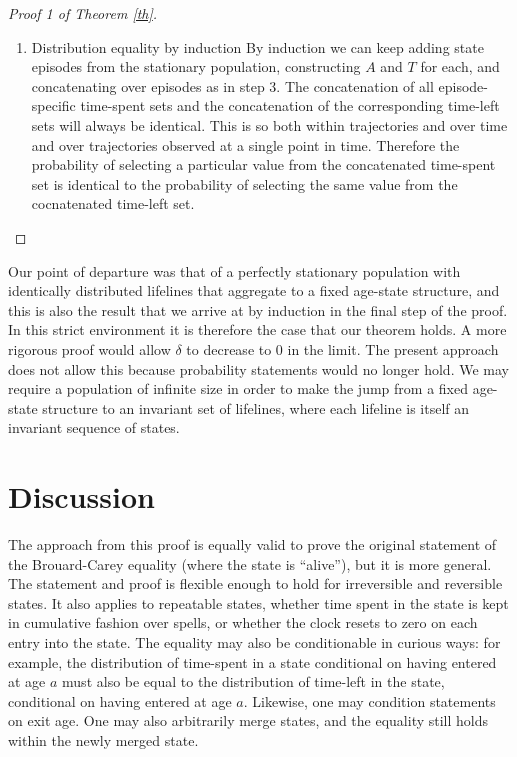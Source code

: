 \documentclass[12pt,oneside,a4paper]{article}
\theoremstyle{definition}
\begin{document}
\begin{proof}[Proof 1 of Theorem \ref{th}]
\begin{enumerate}
\item{Distribution equality by induction} By induction we can keep adding state episodes from the stationary population, constructing $A$ and $T$ for each, and concatenating over episodes as in step 3. The concatenation of all episode-specific time-spent sets and the concatenation 
of the corresponding time-left sets will always be identical. This is so both within trajectories and over time and over trajectories observed at a single point in time. Therefore the probability of selecting a particular value from the concatenated time-spent set is identical
to the probability of selecting the same value from the cocnatenated time-left set.


\end{enumerate}
\end{proof}

Our point of departure was that of a perfectly stationary population with
identically distributed lifelines that aggregate to a fixed age-state structure,
and this is also the result that we arrive at by induction in the final step of
the proof. In this strict environment it is therefore the case that our theorem
holds. A more rigorous proof would allow $\delta$ to decrease to 0 in the
limit. The present approach does not allow this because probability statements
would no longer hold. We may require a population of infinite size in order to
make the jump from a fixed age-state structure to an invariant set of lifelines,
where each lifeline is itself an invariant sequence of states. 

\section{Discussion}
The approach from this proof is equally valid to prove the
original statement of the Brouard-Carey equality (where the state is ``alive''),
but it is more general.
The statement and proof is flexible enough to hold for irreversible and reversible
states. It also applies to repeatable states, whether time spent in the
state is kept in cumulative fashion over spells, or whether the clock resets to
zero on each entry into the state. The equality may also be conditionable in
curious ways: for example, the distribution of time-spent in a state conditional
on having entered at age $a$ must also be equal to the distribution of time-left in
the state, conditional on having entered at age $a$. Likewise, one may condition
statements on exit age. One may also arbitrarily merge states, and the equality
still holds within the newly merged state.
\end{document}
